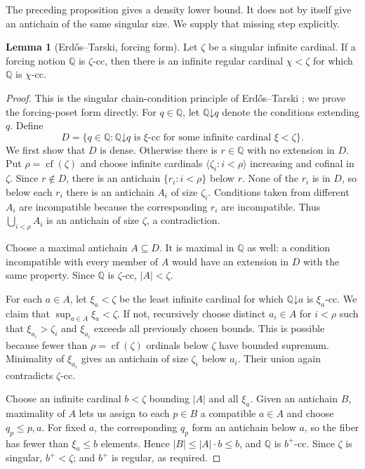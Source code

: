 \documentclass[11pt,letterpaper]{article}
\theoremstyle{definition}
\newtheorem{lemma}[definition]{Lemma}
\numberwithin{equation}{section}
\newcommand{\cf}{\operatorname{cf}}
\newcommand{\cc}{\text{-cc}}
\begin{document}
The preceding proposition gives a density lower bound. It does not by itself give an antichain of the same singular size. We supply that missing step explicitly.

\begin{lemma}[Erd\H{o}s--Tarski, forcing form]\label{lem:et}
Let $\zeta$ be a singular infinite cardinal. If a forcing notion $\mathbb Q$ is $\zeta\cc$, then there is an infinite regular cardinal $\chi<\zeta$ for which $\mathbb Q$ is $\chi\cc$.
\end{lemma}
\begin{proof}
This is the singular chain-condition principle of Erd\H{o}s--Tarski \cite{et}; we prove the forcing-poset form directly. For $q\in\mathbb Q$, let $\mathbb Q\mathord\downarrow q$ denote the conditions extending $q$. Define
\[
D=\{q\in\mathbb Q:\mathbb Q\mathord\downarrow q
\text{ is }\xi\cc\text{ for some infinite cardinal }\xi<\zeta\}.
\]
We first show that $D$ is dense. Otherwise there is $r\in\mathbb Q$ with no extension in $D$. Put $\rho=\cf(\zeta)$ and choose infinite cardinals $\langle\zeta_i:i<\rho\rangle$ increasing and cofinal in $\zeta$. Since $r\notin D$, there is an antichain $\{r_i:i<\rho\}$ below $r$. None of the $r_i$ is in $D$, so below each $r_i$ there is an antichain $A_i$ of size $\zeta_i$. Conditions taken from different $A_i$ are incompatible because the corresponding $r_i$ are incompatible. Thus $\bigcup_{i<\rho}A_i$ is an antichain of size $\zeta$, a contradiction.

Choose a maximal antichain $A\subseteq D$. It is maximal in $\mathbb Q$ as well: a condition incompatible with every member of $A$ would have an extension in $D$ with the same property. Since $\mathbb Q$ is $\zeta\cc$, $|A|<\zeta$.

For each $a\in A$, let $\xi_a<\zeta$ be the least infinite cardinal for which $\mathbb Q\mathord\downarrow a$ is $\xi_a\cc$. We claim that $\sup_{a\in A}\xi_a<\zeta$. If not, recursively choose distinct $a_i\in A$ for $i<\rho$ such that $\xi_{a_i}>\zeta_i$ and $\xi_{a_i}$ exceeds all previously chosen bounds. This is possible because fewer than $\rho=\cf(\zeta)$ ordinals below $\zeta$ have bounded supremum. Minimality of $\xi_{a_i}$ gives an antichain of size $\zeta_i$ below $a_i$. Their union again contradicts $\zeta\cc$.

Choose an infinite cardinal $b<\zeta$ bounding $|A|$ and all $\xi_a$. Given an antichain $B$, maximality of $A$ lets us assign to each $p\in B$ a compatible $a\in A$ and choose $q_p\le p,a$. For fixed $a$, the corresponding $q_p$ form an antichain below $a$, so the fiber has fewer than $\xi_a\le b$ elements. Hence $|B|\le|A|\cdot b\le b$, and $\mathbb Q$ is $b^+\cc$. Since $\zeta$ is singular, $b^+<\zeta$; and $b^+$ is regular, as required.
\end{proof}
\end{document}
